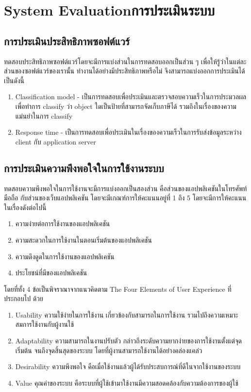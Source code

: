 
\chapter{\ifenglish System Evaluation\else การประเมินระบบ\fi}

\section{การประเมินประสิทธิภาพซอฟต์แวร์}
ทดสอบประสิทธิภาพซอฟต์แวร์โดยจะมีการแบ่งส่วนในการทดสอบออกเป็นส่วน ๆ เพื่อให้รู้ว่าในแต่ละส่วนของซอฟต์แวร์ของเรานั้น 
ทำงานได้อย่างมีประสิทธิภาพหรือไม่ จึงสามารถแบ่งออกการประเมินได้เป็นดังนี้ 
\begin{enumerate}
    \item Classification model - เป็นการทดสอบเพื่อประเมินและตรวจสอบความเร็วในการประมวลผลเพื่อทำการ classify 
    ว่า object ใดเป็นป้ายที่สามารถจัดเก็บภาษีได้ รวมถึงในเรื่องของความแม่นยำในการ classify  
    \item Response time - เป็นการทดสอบเพื่อประเมินในเรื่องของความเร็วในการรับส่งข้อมูลระหว่าง client กับ application server  
\end{enumerate}

\section{การประเมินความพึงพอใจในการใช้งานระบบ}
ทดสอบความพึงพอใจในการใช้งานจะมีการแบ่งออกเป็นสองส่วน คือส่วนของแอปพลิเคชันในโทรศัพท์มือถือ กับส่วนของเว็บแอปพลิเคชัน 
โดยจะมีเกณฑ์การให้คะแนนอยู่ที่ 1 ถึง 5 โดยจะมีการให้คะแนนในเรื่องดังต่อไปนี้ 
\begin{enumerate}
    \item ความง่ายต่อการใช้งานของแอปพลิเคชัน 
    \item ความสะดวกในการใช้งานในตอนเริ่มต้นของแอปพลิเคชัน 
    \item ความดึงดูดในการใช้งานของแอปพลิเคชัน        
    \item ประโยชน์ที่มีของแอปพลิเคชัน 
\end{enumerate}
โดยที่ทั้ง 4 ข้อเป็นพิจราณาจากแนวคิดตาม The Four Elements of User Experience \cite{uxquantification} ที่ประกอบไป ด้วย 
\begin{enumerate}
    \item Usability ความใช้ง่ายในการใช้งาน เกี่ยวข้องกับสามารถในการใช้งาน รวมไปถึงความเหมาะสมการใช้งานกับผู้งานใช้ 
    \item Adaptability ความสามารถในงานปรับตัว กล่าวถึงระดับความยากง่ายของการใช้งานตั้งแต่จุดเริ่มต้น จนถึงจุดสิ้นสุดของระบบ โดยที่ผู้งานสามารถใช้งานได้อย่างคล่องแคล่ว 
    \item Desirability ความพึงพอใจ คือเมื่อใช้งานแล้วผู้ได้รับประสบการณ์ที่ดีในจากใช้งานของระบบ 
    \item Value คุณค่าของระบบ คือระบบที่ผู้ใช้เข้ามาใช้งานมีความสอดคล้องกับความต้องการของผู้ใช้ 
\end{enumerate}